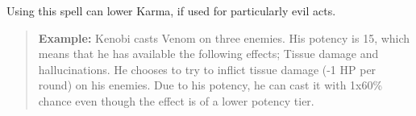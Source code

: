 \documentclass[11pt,a4paper,twocolumn]{book}
\begin{document}
Using this spell can lower Karma, if used for particularly evil acts.






\begin{verse}
	\textbf{Example:} Kenobi casts Venom on three enemies. His potency is 15, which means that he has available the following effects; Tissue damage and hallucinations. He chooses to try to inflict tissue damage (-1 HP per round) on his enemies. Due to his potency, he can cast it with 1x60\% chance even though the effect is of a lower potency tier.
\end{verse}






\end{document}

